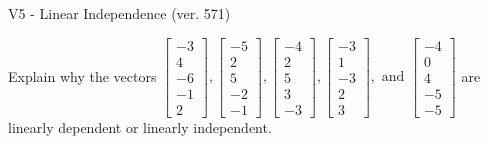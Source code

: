 \begin{exercise}
  \begin{exerciseTitle}V5 - Linear Independence (ver. 571)\end{exerciseTitle}
  \begin{exerciseStatement}
    Explain why the vectors \(\left[\begin{array}{r}
-3 \\
4 \\
-6 \\
-1 \\
2
\end{array}\right] , \left[\begin{array}{r}
-5 \\
2 \\
5 \\
-2 \\
-1
\end{array}\right] , \left[\begin{array}{r}
-4 \\
2 \\
5 \\
3 \\
-3
\end{array}\right] , \left[\begin{array}{r}
-3 \\
1 \\
-3 \\
2 \\
3
\end{array}\right] , \text{ and } \left[\begin{array}{r}
-4 \\
0 \\
4 \\
-5 \\
-5
\end{array}\right]\) are linearly dependent or linearly independent.	



\end{exerciseStatement}
\end{exercise}
